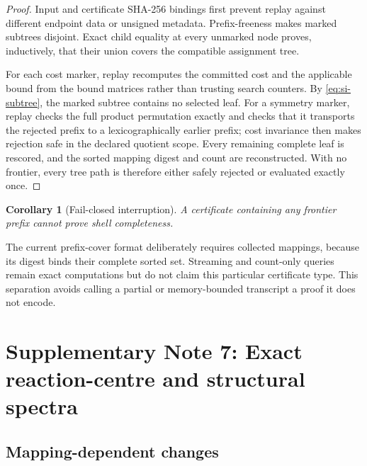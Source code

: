 \documentclass[11pt]{article}
\newtheorem{corollary}[theorem]{Corollary}
\theoremstyle{definition}
\begin{document}
\begin{proof}
Input and certificate SHA-256 bindings first prevent replay against different
endpoint data or unsigned metadata.  Prefix-freeness makes marked subtrees
disjoint.  Exact child equality at every unmarked node proves, inductively,
that their union covers the compatible assignment tree.

For each cost marker, replay recomputes the committed cost and the applicable
bound from the bound matrices rather than trusting search counters.  By
\cref{eq:si-subtree}, the marked subtree contains no selected leaf.  For a
symmetry marker, replay checks the full product permutation exactly and checks
that it transports the rejected prefix to a lexicographically earlier prefix;
cost invariance then makes rejection safe in the declared quotient scope.
Every remaining complete leaf is rescored, and the sorted mapping digest and
count are reconstructed.  With no frontier, every tree path is therefore
either safely rejected or evaluated exactly once.
\end{proof}

\begin{corollary}[Fail-closed interruption]
A certificate containing any frontier prefix cannot prove shell completeness.
\end{corollary}

The current prefix-cover format deliberately requires collected mappings,
because its digest binds their complete sorted set.  Streaming and count-only
queries remain exact computations but do not claim this particular
certificate type.  This separation avoids calling a partial or memory-bounded
transcript a proof it does not encode.

\section{Supplementary Note 7: Exact reaction-centre and structural spectra}

\subsection{Mapping-dependent changes}
\end{document}
